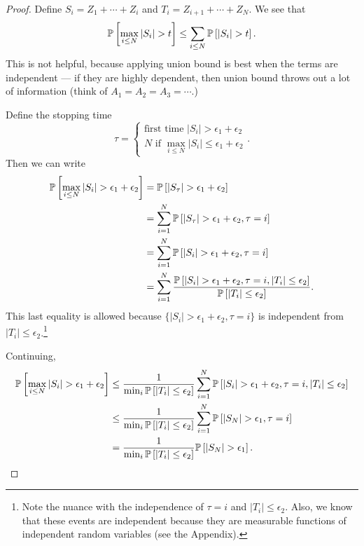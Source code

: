 \begin{proof}
	Define $S_i = Z_1+\cdots+Z_i$ and $T_i = Z_{i+1} + \cdots + Z_N$.
	We see that 
	\begin{align*}
		\P\left[\max_{i \le N} \left| S_i \right| > t\right] \le \sum\limits_{i \le N}^{} \P\left[\left| S_i \right| > t\right] 
	.\end{align*} This is not helpful, because applying union bound is best when the terms are independent --- if they are highly dependent, then union bound throws out a lot of information (think of $A_1 = A_2 = A_3 =\cdots$.)

	Define the stopping time \[
		\tau = \begin{cases}
			\text{first time } \left| S_i \right| > \epsilon_1 + \epsilon_2 \\
			N \text{ if } \max_{i \le N} \left| S_i \right| \le \epsilon_1 + \epsilon_2
		\end{cases}
	.\] Then we can write 
	\begin{align*}
		\P\left[\max_{i \le N} \left| S_i \right| > \epsilon_1 + \epsilon_2\right] &= \P\left[\left| S_\tau \right| > \epsilon_1 + \epsilon_2\right]  \\
				   &= \sum\limits_{i=1}^{N} \P\left[\left| S_\tau \right| > \epsilon_1 + \epsilon_2, \tau = i	\right] \\
				   &= \sum\limits_{i=1}^{N} \P\left[\left| S_i \right| > \epsilon_1 + \epsilon_2, \tau = i\right] \\
				   &= \sum\limits_{i=1}^{N} \frac{\P\left[\left| S_i \right| > \epsilon_1 + \epsilon_2, \tau = i, \left| T_i \right| \le \epsilon_2\right] }{\P\left[\left| T_i \right| \le \epsilon_2\right] }
	.\end{align*}
	This last equality is allowed because $\{\left| S_i \right| > \epsilon_1 + \epsilon_2, \tau = i\}$ is independent from $\left| T_i \right| \le \epsilon_2$.\footnote{Note the nuance with the independence of $\tau = i$ and $\left| T_i \right| \le \epsilon_2$. Also, we know that these events are independent because they are measurable functions of independent random variables (see the Appendix).}

	Continuing,
		\begin{align*}
			\P\left[\max_{i\le N} \left| S_i \right| > \epsilon_1 + \epsilon_2\right] &\le \frac{1}{\min_i \P\left[\left| T_i \right| \le \epsilon_2\right] } \sum\limits_{i=1}^{N} \P\left[\left| S_i \right| > \epsilon_1 + \epsilon_2, \tau = i, \left| T_i \right| \le \epsilon_2\right] \\
																					  &\le \frac{1}{\min_i \P\left[\left| T_i \right| \le \epsilon_2\right] } \sum\limits_{i=1}^{N} \P\left[\left| S_N \right| > \epsilon_1, \tau = i\right] \\
																					  &= \frac{1}{\min_i \P\left[\left| T_i \right| \le \epsilon_2\right] } \P\left[\left| S_N \right| > \epsilon_1\right] 
		.\end{align*}

\end{proof}

